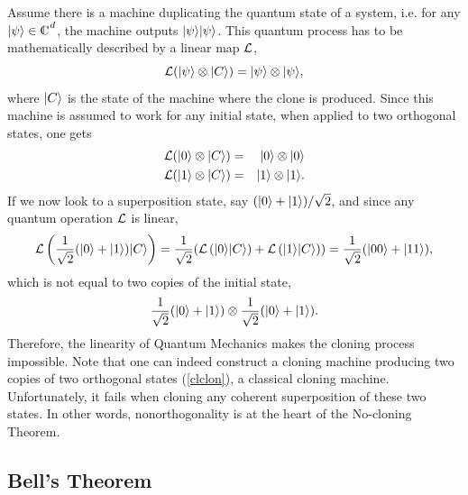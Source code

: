 \documentclass[a4paper]{article}
\def\L{{\cal L}}
\def\compl{\begin{picture}(8,8)\put(0,0){C}\put(3,0.3){\line(0,1){7}}\end{picture}}
\begin{document}
Assume there is a machine duplicating the quantum state of a
system, i.e. for any  $\ket\psi\in\compl^d$, the
machine outputs $|\psi\rangle|\psi\rangle$. This quantum process has to be
mathematically described by a linear map $\L$,
\begin{equation}\label{clmach}
    \L(\ket{\psi}\otimes\ket{C})=\ket{\psi}\otimes\ket{\psi} ,
\end{equation}
where $|C\rangle$ is the state of the machine where the clone is
produced. Since this machine is assumed to work for any initial
state, when applied to two orthogonal states, one gets
\begin{eqnarray}
\label{clclon}
  \L(\ket{0}\otimes\ket{C}) &=& \ket{0}\otimes\ket{0} \nonumber\\
  \L(\ket{1}\otimes\ket{C}) &=& \ket{1}\otimes\ket{1} .
\end{eqnarray}
If we now look to a superposition state, say $(|0\rangle+|1\rangle)/\sqrt 2$, and since any quantum operation $\L$ is linear,
\begin{equation}
    \L\left(\frac{1}{\sqrt 2}(\ket 0+\ket 1)\ket C\right)=
    \frac{1}{\sqrt 2}(\L\left(\ket 0\ket C\right)+\L\left(\ket 1\ket C\right))=
    \frac{1}{\sqrt 2}(\ket{00}+\ket{11}) ,
\end{equation}
which is not equal to two copies of the initial state,
\begin{equation}
    \frac{1}{\sqrt 2}(|0\rangle+|1\rangle)\otimes
    \frac{1}{\sqrt 2}(|0\rangle+|1\rangle) .
\end{equation}
Therefore, the linearity of Quantum Mechanics makes the cloning
process impossible. Note that one can indeed construct a cloning
machine producing two copies of two orthogonal states
(\ref{clclon}), a classical cloning machine. Unfortunately, it
fails when cloning any coherent superposition of these two states.
In other words, nonorthogonality is at the heart of the No-cloning
Theorem.

\subsection{Bell's Theorem}
\end{document}
